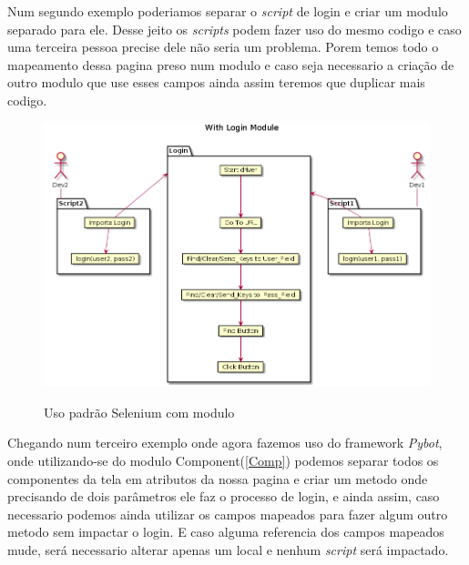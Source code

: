     \clearpage

    Num segundo exemplo poderiamos separar o \emph{script} de login e criar um modulo separado para ele. Desse jeito
    os \emph{scripts} podem fazer uso do mesmo codigo e caso uma terceira pessoa precise dele não seria um problema.
    Porem temos todo o mapeamento dessa pagina preso num modulo e caso seja necessario a criação de outro
    modulo que use esses campos ainda assim teremos que duplicar mais codigo.

    \begin{figure}[H]
        \vspace*{0,3cm}
        \centering
        \caption{Uso padrão Selenium com modulo}
        \includegraphics[width=1\textwidth]{./04-figuras/page_object_module}
        \label{fig:selenium_module}
    \end{figure}

    \clearpage
    Chegando num terceiro exemplo onde agora fazemos uso do framework \emph{Pybot}, onde utilizando-se do
    modulo Component(\ref{Comp}) podemos separar todos os componentes da tela em atributos da nossa pagina
    e criar um metodo onde precisando de dois parâmetros ele faz o processo de login, e ainda assim, caso
    necessario podemos ainda utilizar os campos mapeados para fazer algum outro metodo sem impactar o login.
    E caso alguma referencia dos campos mapeados mude, será necessario alterar apenas um local e nenhum \emph{script}
    será impactado.

